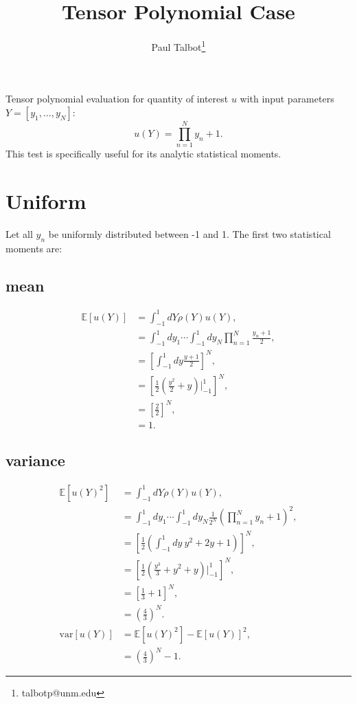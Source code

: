 \documentclass[11pt]{article}
\newcommand{\expv}[1]{\ensuremath{\mathbb{E}[ #1]}}
\begin{document}
\title{Tensor Polynomial Case}

\author{Paul Talbot\thanks{talbotp@unm.edu}}
\date{}
\maketitle

Tensor polynomial evaluation for quantity of interest $u$ with input parameters $Y=[y_1,\ldots,y_N]$:
\begin{equation}
u(Y) = \prod_{n=1}^N y_n+1.
\end{equation}
This test is specifically useful for its analytic statistical moments.

\section{Uniform}
Let all $y_n$ be uniformly distributed between -1 and 1.  The first two statistical moments are:
\subsection{mean}
\begin{align}
\expv{u(Y)} &=\int_{-1}^1 dY \rho(Y)u(Y),\\
  &=\int_{-1}^1 dy_1\cdots\int_{-1}^1 dy_N \prod_{n=1}^N \frac{y_n+1}{2},\\
  &=\left[ \int_{-1}^1 dy \frac{y+1}{2}\right]^N,\\
  &=\left[\frac{1}{2}\left(\frac{y^2}{2}+y\right)\bigg|_{-1}^1\right]^N,\\
  &=\left[\frac{2}{2}\right]^N,\\
  &=1.
\end{align}
\subsection{variance}
\begin{align}
\expv{u(Y)^2} &= \int_{-1}^1 dY \rho(Y)u(Y),\\
  &=\int_{-1}^1 dy_1\cdots\int_{-1}^1 dy_N \frac{1}{2^N} \left(\prod_{n=1}^N y_n+1\right)^2,\\
  &=\left[\frac{1}{2}\left(\int_{-1}^1 dy\ y^2+2y+1 \right)\right]^N,\\
  &=\left[\frac{1}{2}\left(\frac{y^3}{3}+y^2+y \right)\bigg|_{-1}^1 \right]^N,\\
  &=\left[\frac{1}{3}+1\right]^N, \\
  &=\left(\frac{4}{3}\right)^N.\\
\text{var}[u(Y)] &= \expv{u(Y)^2}-\expv{u(Y)}^2,\\
  &= \left(\frac{4}{3}\right)^N-1.
\end{align}
\end{document}
